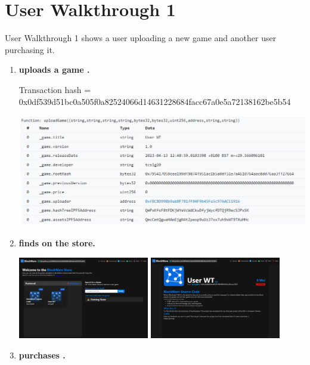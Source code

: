 
\section*{User Walkthrough 1}

User Walkthrough 1 shows a user  uploading a new game  and another user  purchasing it.
\begin{enumerate}[itemsep=2.5pt]
  \item \textbf{ uploads a game .}

  \small Transaction hash = 0x0df539d51bc0a505f0a82524066d14631228684facc67a0e5a72138162be5b54\normalsize

  \includegraphics[width=\textwidth]{assets/images/user-walkthrough/1/upload.png}


  \item \textbf{ finds  on the store.}
  
  \includegraphics[width=0.45\textwidth]{assets/images/user-walkthrough/1/store.png}
  \includegraphics[width=0.45\textwidth]{assets/images/user-walkthrough/1/store-entry.png}
  
  \item \textbf{ purchases .}
   

\end{enumerate}
